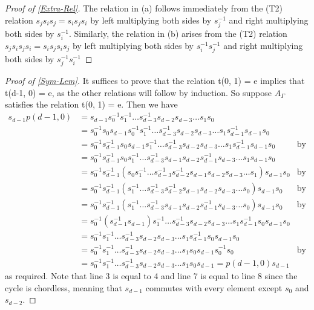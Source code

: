 \documentclass[11pt]{amsart}
\theoremstyle{definition}
\begin{document}
\begin{proof}[Proof of \ref{Extra-Rel}]
The relation in (a) follows immediately from the (T2) relation $s_{j}s_{i}s_{j} = s_{i}s_{j}s_{i}$ by left multiplying both sides by $s_{j}^{-1}$ and right multiplying both sides by $s_{i}^{-1}$. Similarly, the relation in (b) arises from the (T2) relation $s_{j}s_{i}s_{j}s_{i} = s_{i}s_{j}s_{i}s_{j}$ by left multiplying both sides by $s_{i}^{-1}s_{j}^{-1}$ and right multiplying both sides by $s_{j}^{-1}s_{i}^{-1}$
\end{proof}   
\begin{proof}[Proof of \ref{Sym-Lem}]
It suffices to prove that the relation t(0, 1) = e implies that t(d-1, 0) = e, as the other relations will follow by induction. So suppose $A_{\Gamma}$ satisfies the relation t(0, 1) = e. Then we have
\begin{align*}
s_{d-1}p(d-1, 0) & = s_{d-1}s_{0}^{-1}s_{1}^{-1}\dots s_{d-3}^{-1}s_{d-2}s_{d-3}\dots s_1s_0 \\
&= s_{0}^{-1}s_{0}s_{d-1}s_{0}^{-1}s_{1}^{-1}\dots s_{d-3}^{-1}s_{d-2}s_{d-3}\dots s_{1}s_{d-1}^{-1}s_{d-1}s_{0} \\
&= s_{0}^{-1}s_{d-1}^{-1}s_{0}s_{d-1}s_{1}^{-1}\dots s_{d-3}^{-1}s_{d-2}s_{d-3}\dots s_{1}s_{d-1}^{-1}s_{d-1}s_{0} &\text{by (T2)} \\
&= s_{0}^{-1}s_{d-1}^{-1}s_{0}s_{1}^{-1}\dots s_{d-3}^{-1}s_{d-1}s_{d-2}s_{d-1}^{-1}s_{d-3}\dots s_{1}s_{d-1}s_{0} \\
&= s_{0}^{-1}s_{d-1}^{-1}(s_{0}s_{1}^{-1}\dots s_{d-3}^{-1}s_{d-2}^{-1}s_{d-1}s_{d-2}s_{d-3}\dots s_{1})s_{d-1}s_{0} &\text{by (T2)}\\
&= s_{0}^{-1}s_{d-1}^{-1}(s_{1}^{-1} \dots s_{d-3}^{-1}s_{d-2}^{-1}s_{d-1}s_{d-2}s_{d-3}\dots s_{0})s_{d-1}s_{0} &\text{by t(0, 1) = e}\\
&= s_{0}^{-1}s_{d-1}^{-1}(s_{1}^{-1} \dots s_{d-3}^{-1}s_{d-1}s_{d-2}s_{d-1}^{-1}s_{d-3}\dots s_{0})s_{d-1}s_{0} &\text{by (T2)}\\
&= s_{0}^{-1}(s_{d-1}^{-1}s_{d-1})s_{1}^{-1}\dots s_{d-3}^{-1}s_{d-2}s_{d-3}\dots s_{1}s_{d-1}^{-1}s_{0}s_{d-1}s_{0} \\
&= s_{0}^{-1}s_{1}^{-1}\dots s_{d-3}^{-1}s_{d-2}s_{d-3}\dots s_{1}s_{d-1}^{-1}s_{0}s_{d-1}s_{0} \\
&= s_{0}^{-1}s_{1}^{-1}\dots s_{d-3}^{-1}s_{d-2}s_{d-3}\dots s_{1}s_{0}s_{d-1}s_{0}^{-1}s_{0} &\text{by (T2)}\\
&= s_{0}^{-1}s_{1}^{-1}\dots s_{d-3}^{-1}s_{d-2}s_{d-3}\dots s_{1}s_{0}s_{d-1} = p(d-1, 0)s_{d-1}
\end{align*}
as required. Note that line 3 is equal to 4 and line 7 is equal to line 8 since the cycle is chordless, meaning that $s_{d-1}$ commutes with every element except $s_{0}$ and $s_{d-2}$.
\end{proof}
\end{document}
